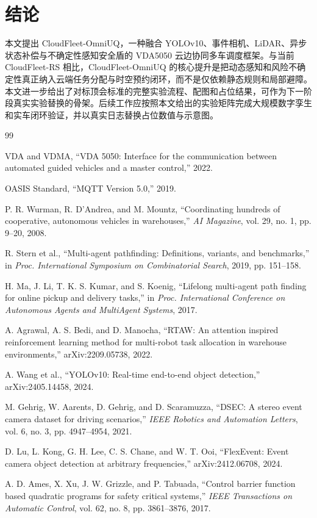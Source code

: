 \documentclass[UTF8,twocolumn,10pt]{ctexart}
\newcommand{\method}{CloudFleet-OmniUQ}
\newcommand{\baseline}{CloudFleet-RS}
\begin{document}
\section{结论}

本文提出 \method{}，一种融合 YOLOv10、事件相机、LiDAR、异步状态补偿与不确定性感知安全盾的 VDA5050 云边协同多车调度框架。与当前 \baseline{} 相比，\method{} 的核心提升是把动态感知和风险不确定性真正纳入云端任务分配与时空预约闭环，而不是仅依赖静态规则和局部避障。本文进一步给出了对标顶会标准的完整实验流程、配图和占位结果，可作为下一阶段真实实验替换的骨架。后续工作应按照本文给出的实验矩阵完成大规模数字孪生和实车闭环验证，并以真实日志替换占位数值与示意图。

\begin{thebibliography}{99}

VDA and VDMA, ``VDA 5050: Interface for the communication between automated guided vehicles and a master control,'' 2022.

OASIS Standard, ``MQTT Version 5.0,'' 2019.

P. R. Wurman, R. D'Andrea, and M. Mountz, ``Coordinating hundreds of cooperative, autonomous vehicles in warehouses,'' \emph{AI Magazine}, vol. 29, no. 1, pp. 9--20, 2008.

R. Stern et al., ``Multi-agent pathfinding: Definitions, variants, and benchmarks,'' in \emph{Proc. International Symposium on Combinatorial Search}, 2019, pp. 151--158.

H. Ma, J. Li, T. K. S. Kumar, and S. Koenig, ``Lifelong multi-agent path finding for online pickup and delivery tasks,'' in \emph{Proc. International Conference on Autonomous Agents and MultiAgent Systems}, 2017.

A. Agrawal, A. S. Bedi, and D. Manocha, ``RTAW: An attention inspired reinforcement learning method for multi-robot task allocation in warehouse environments,'' arXiv:2209.05738, 2022.

A. Wang et al., ``YOLOv10: Real-time end-to-end object detection,'' arXiv:2405.14458, 2024.

M. Gehrig, W. Aarents, D. Gehrig, and D. Scaramuzza, ``DSEC: A stereo event camera dataset for driving scenarios,'' \emph{IEEE Robotics and Automation Letters}, vol. 6, no. 3, pp. 4947--4954, 2021.

D. Lu, L. Kong, G. H. Lee, C. S. Chane, and W. T. Ooi, ``FlexEvent: Event camera object detection at arbitrary frequencies,'' arXiv:2412.06708, 2024.

A. D. Ames, X. Xu, J. W. Grizzle, and P. Tabuada, ``Control barrier function based quadratic programs for safety critical systems,'' \emph{IEEE Transactions on Automatic Control}, vol. 62, no. 8, pp. 3861--3876, 2017.

\end{thebibliography}

\balance
\end{document}
